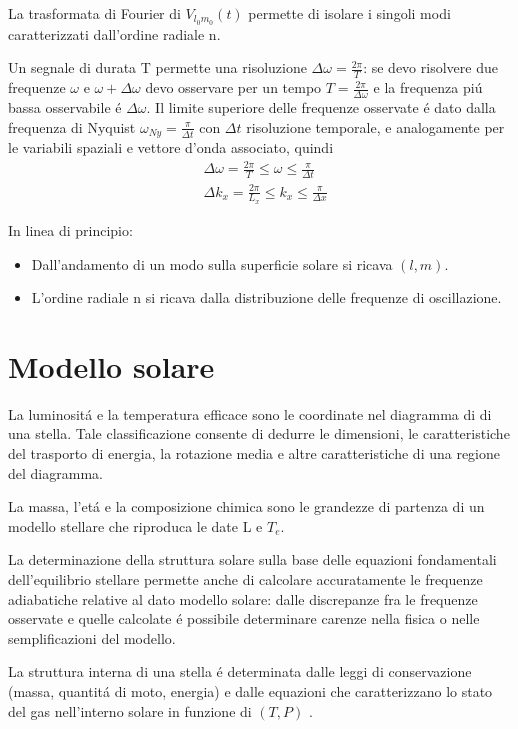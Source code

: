 \documentclass[oneside,12pt]{memoir}
\begin{document}
La trasformata di Fourier di $V_{l_0m_0}(t)$ permette di isolare i singoli modi caratterizzati dall'ordine radiale n.

Un segnale di durata T permette una risoluzione $\Delta\omega=\frac{2\pi}{T}$: se devo risolvere due frequenze $\omega$ e $\omega+\Delta\omega$ devo osservare per un tempo $T=\frac{2\pi}{\Delta\omega}$ e la frequenza pi\'u bassa osservabile \'e $\Delta\omega$. Il limite superiore delle frequenze osservate \'e dato dalla frequenza di Nyquist $\omega_{Ny}=\frac{\pi}{\Delta t}$ con $\Delta t$ risoluzione temporale, e analogamente per le variabili spaziali e vettore d'onda associato, quindi
\begin{align}
&\Delta\omega=\frac{2\pi}{T}\leq\omega\leq\frac{\pi}{\Delta t}\\
&\Delta k_x=\frac{2\pi}{L_x}\leq k_x\leq\frac{\pi}{\Delta x}
\end{align}


In linea di principio:
\begin{itemize}
    \item Dall'andamento di un modo sulla superficie solare si ricava $(l,m)$.
    \item L'ordine radiale n si ricava dalla distribuzione delle frequenze di oscillazione.
\end{itemize}


\chapter{Modello solare}

La luminosit\'a e la temperatura efficace sono le coordinate nel diagramma di \hr{} di una stella. Tale classificazione consente di dedurre le dimensioni, le caratteristiche del trasporto di energia, la rotazione media e altre caratteristiche di una regione del diagramma.

La massa, l'et\'a e la composizione chimica sono le grandezze di partenza di un modello stellare che riproduca le date L e $T_e$.

La determinazione della struttura solare sulla base delle equazioni fondamentali dell'equilibrio stellare permette anche di calcolare accuratamente le frequenze adiabatiche relative al dato modello solare: dalle discrepanze fra le frequenze osservate e quelle calcolate \'e possibile determinare carenze nella fisica o nelle semplificazioni del modello.

La struttura interna di una stella \'e determinata dalle leggi di conservazione (massa, quantit\'a di moto, energia) e dalle equazioni che caratterizzano lo stato del gas nell'interno solare in funzione di $(T,P)$ .
\end{document}
